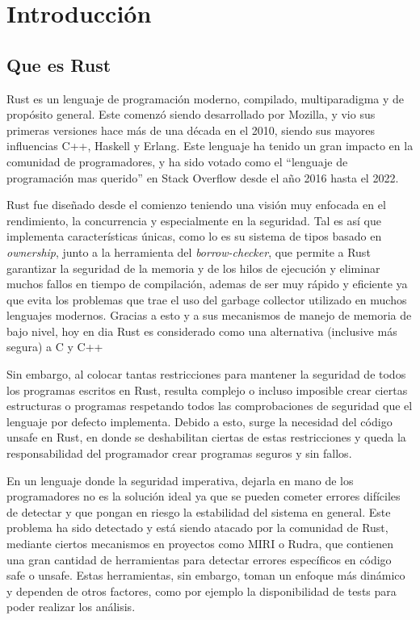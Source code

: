 \chapter{Introducción}

\section{Que es Rust}

Rust es un lenguaje de programación moderno, compilado, multiparadigma y de propósito general. Este comenzó siendo desarrollado por Mozilla, y vio sus primeras versiones hace más de una década en el 2010, siendo sus mayores influencias C++, Haskell y Erlang. Este lenguaje ha tenido un gran impacto en la comunidad de programadores, y ha sido votado como el “lenguaje de programación mas querido” en Stack Overflow desde el año 2016 hasta el 2022.

Rust fue diseñado desde el comienzo teniendo una visión muy enfocada en el rendimiento, la concurrencia y especialmente en la seguridad. Tal es así que implementa características únicas, como lo es su sistema de tipos basado en \textit{ownership}, junto a la herramienta del \textit{borrow-checker}, que permite a Rust garantizar la seguridad de la memoria y de los hilos de ejecución y eliminar muchos fallos en tiempo de compilación, ademas de ser muy rápido y eficiente ya que evita los problemas que trae el uso del garbage collector utilizado en muchos lenguajes modernos. Gracias a esto y a sus mecanismos de manejo de memoria de bajo nivel, hoy en dia Rust es considerado como una alternativa (inclusive más segura) a C y C++

Sin embargo, al colocar tantas restricciones para mantener la seguridad de todos los programas escritos en Rust, resulta complejo o incluso imposible crear ciertas estructuras o programas respetando todos las comprobaciones de seguridad que el lenguaje por defecto implementa. Debido a esto, surge la necesidad del código unsafe en Rust, en donde se deshabilitan ciertas de estas restricciones y queda la responsabilidad del programador crear programas seguros y sin fallos.

En un lenguaje donde la seguridad imperativa, dejarla en mano de los programadores no es la solución ideal ya que se pueden cometer errores difíciles de detectar y que pongan en riesgo la estabilidad del sistema en general. Este problema ha sido detectado y está siendo atacado por la comunidad de Rust, mediante ciertos mecanismos en proyectos como MIRI o Rudra, que contienen una gran cantidad de herramientas para detectar errores específicos en código safe o unsafe. Estas herramientas, sin embargo, toman un enfoque más dinámico y dependen de otros factores, como por ejemplo la disponibilidad de tests para poder realizar los análisis.

